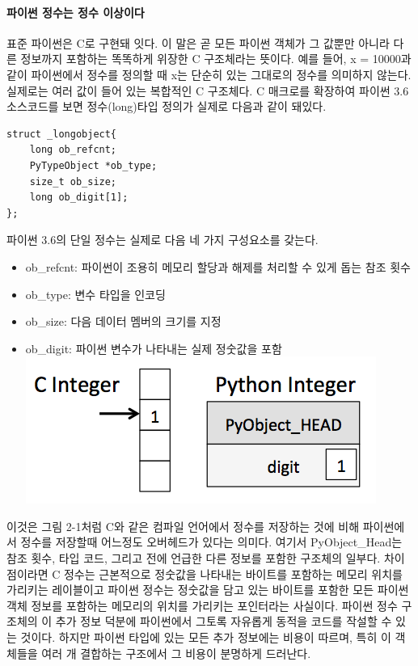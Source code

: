 \documentclass[11pt]{article}
\makeatletter
\def\maxwidth{\ifdim\Gin@nat@width>\linewidth\linewidth
    \else\Gin@nat@width\fi}
\let\Oldincludegraphics\includegraphics
\renewcommand{\includegraphics}[1]{\Oldincludegraphics[width=.8\maxwidth]{#1}}
\providecommand{\tightlist}{%
      \setlength{\itemsep}{0pt}\setlength{\parskip}{0pt}}
\makeatother
\begin{document}
    \hypertarget{uxd30cuxc774uxc36c-uxc815uxc218uxb294-uxc815uxc218-uxc774uxc0c1uxc774uxb2e4}{%
\paragraph{파이썬 정수는 정수
이상이다}\label{uxd30cuxc774uxc36c-uxc815uxc218uxb294-uxc815uxc218-uxc774uxc0c1uxc774uxb2e4}}

표준 파이썬은 C로 구현돼 잇다. 이 말은 곧 모든 파이썬 객체가 그 값뿐만
아니라 다른 정보까지 포함하는 똑똑하게 위장한 C 구조체라는 뜻이다. 예를
들어, x = 10000과 같이 파이썬에서 정수를 정의할 때 x는 단순히 있는
그대로의 정수를 의미하지 않는다. 실제로는 여러 값이 들어 있는 복합적인 C
구조체다. C 매크로를 확장하여 파이썬 3.6 소스코드를 보면 정수(long)타입
정의가 실제로 다음과 같이 돼있다.

\begin{verbatim}
struct _longobject{
    long ob_refcnt;
    PyTypeObject *ob_type;
    size_t ob_size;
    long ob_digit[1];
};
\end{verbatim}

파이썬 3.6의 단일 정수는 실제로 다음 네 가지 구성요소를 갖는다.

\begin{itemize}
\tightlist
\item
  ob\_refcnt: 파이썬이 조용히 메모리 할당과 해제를 처리할 수 있게 돕는
  참조 횟수
\item
  ob\_type: 변수 타입을 인코딩
\item
  ob\_size: 다음 데이터 멤버의 크기를 지정
\item
  ob\_digit: 파이썬 변수가 나타내는 실제 정숫값을 포함
  \includegraphics{figures/cint_vs_pyint.png}
\end{itemize}

이것은 그림 2-1처럼 C와 같은 컴파일 언어에서 정수를 저장하는 것에 비해
파이썬에서 정수를 저장할때 어느정도 오버헤드가 있다는 의미다. 여기서
PyObject\_Head는 참조 횟수, 타입 코드, 그리고 전에 언급한 다른 정보를
포함한 구조체의 일부다. 차이점이라면 C 정수는 근본적으로 정숫값을
나타내는 바이트를 포함하는 메모리 위치를 가리키는 레이블이고 파이썬
정수는 정숫값을 담고 있는 바이트를 포함한 모든 파이썬 객체 정보를
포함하는 메모리의 위치를 가리키는 포인터라는 사실이다. 파이썬 정수
구조체의 이 추가 정보 덕분에 파이썬에서 그토록 자유롭게 동적을 코드를
작설할 수 있는 것이다. 하지만 파이썬 타입에 있는 모든 추가 정보에는
비용이 따르며, 특히 이 객체들을 여러 개 결합하는 구조에서 그 비용이
분명하게 드러난다.
\end{document}
